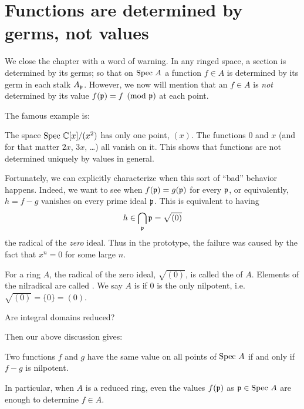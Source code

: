 \section{Functions are determined by germs, not values}

We close the chapter with a word of warning.
In any ringed space, a section is determined by its germs;
so that on $\text{Spec } A$ a function $f \in A$ is determined
by its germ in each stalk $A_\mathfrak p$.
However, we now will mention that an $f \in A$ is \emph{not}
determined by its value $f(\mathfrak p) = f \pmod {\mathfrak p}$ at each point.

The famous example is:
\begin{example}
	The space $\text{Spec } \mathbb C[x] / (x^2)$ has only one point, $(x)$.
	The functions $0$ and $x$ (and for that matter $2x$, $3x$, \dots)
	all vanish on it.
	This shows that functions are not determined uniquely
	by values in general.
\end{example}

Fortunately, we can explicitly characterize
when this sort of ``bad'' behavior happens.
Indeed, we want to see when $f(\mathfrak p) = g(\mathfrak p)$ for every $\mathfrak p$,
or equivalently, $h = f-g$ vanishes on every prime ideal $\mathfrak p$.
This is equivalent to having
\[ h \in \bigcap_{\mathfrak p} \mathfrak p = \sqrt{(0)} \]
the radical of the \emph{zero} ideal.
Thus in the prototype, the failure was caused by the fact that $x^n = 0$
for some large $n$.

\begin{definition}
	For a ring $A$, the radical of the zero ideal, $\sqrt{(0)}$,
	is called the  of $A$.
	Elements of the nilradical are called .
	We say $A$ is  if $0$ is the only nilpotent,
	i.e.\ $\sqrt{(0)} = \{0\} = (0)$.
\end{definition}
\begin{ques}
	Are integral domains reduced?
\end{ques}

Then our above discussion gives:
\begin{theorem}
	Two functions $f$ and $g$ have the same value
	on all points of $\text{Spec } A$ if and only if $f-g$ is nilpotent.
\end{theorem}
In particular, when $A$ is a reduced ring,
even the values $f(\mathfrak p)$ as $\mathfrak p \in \text{Spec } A$
are enough to determine $f \in A$.

